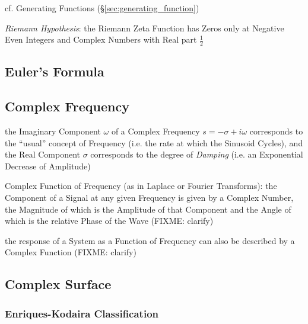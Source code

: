 \fist cf. Generating Functions (\S\ref{sec:generating_function})

\emph{Riemann Hypothesis}: the Riemann Zeta Function has Zeros only at Negative
Even Integers and Complex Numbers with Real part $\frac{1}{2}$



\subsection{Euler's Formula}\label{sec:eulers_formula}

\subsection{Complex Frequency}\label{sec:complex_frequency}

the Imaginary Component $\omega$ of a Complex Frequency $s = -\sigma + i\omega$
corresponds to the ``usual'' concept of Frequency (i.e. the rate at which the
Sinusoid Cycles), and the Real Component $\sigma$ corresponds to the degree of
\emph{Damping} (i.e. an Exponential Decrease of Amplitude)

Complex Function of Frequency (as in Laplace or Fourier Transforms): the
Component of a Signal at any given Frequency is given by a Complex Number, the
Magnitude of which is the Amplitude of that Component and the Angle of which is
the relative Phase of the Wave (FIXME: clarify)

the response of a System as a Function of Frequency can also be described by a
Complex Function (FIXME: clarify)



\subsection{Complex Surface}\label{sec:complex_surface}

\subsubsection{Enriques-Kodaira Classification}
\label{sec:enriques_kodaira}

